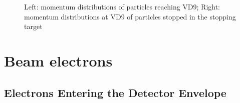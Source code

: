 \documentclass[12pt]{article}
\begin{document}
\begin{figure}[H]
  \hspace{-0.5in}
  \caption{
    \label{fig:03700_bmum0s37b0_vdet_xx09_mom}
    Left: momentum distributions of particles reaching VD9;
    Right: momentum distributions at VD9 of particles stopped in the stopping target
  }
\end{figure}


\section {Beam electrons}

\subsection {Electrons Entering the Detector Envelope}
\end{document}
